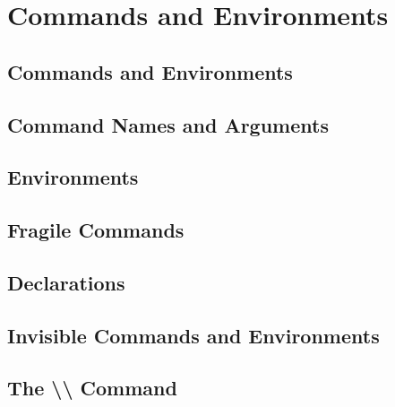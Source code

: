 \section{Commands and Environments}
\subsection{Commands and Environments}


\subsection{Command Names and Arguments}


\subsection{Environments}


\subsection{Fragile Commands}


\subsection{Declarations}


\subsection{Invisible Commands and Environments}


\subsection{The \textbackslash\textbackslash{} Command}
\newpage